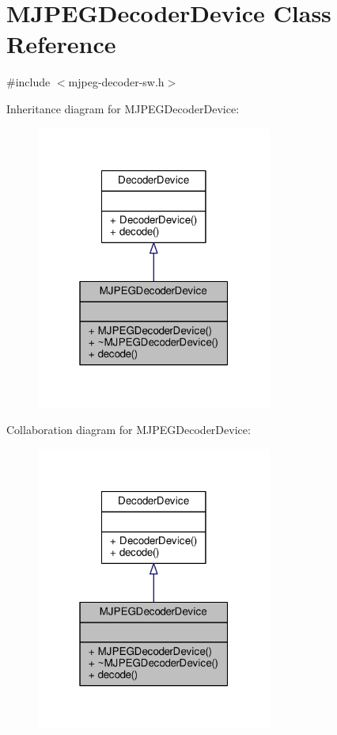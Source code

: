 \hypertarget{classMJPEGDecoderDevice}{}\section{M\+J\+P\+E\+G\+Decoder\+Device Class Reference}
\label{classMJPEGDecoderDevice}


{\ttfamily \#include $<$mjpeg-\/decoder-\/sw.\+h$>$}



Inheritance diagram for M\+J\+P\+E\+G\+Decoder\+Device\+:
\nopagebreak
\begin{figure}[H]
\begin{center}
\leavevmode
\includegraphics[width=220pt]{classMJPEGDecoderDevice__inherit__graph}
\end{center}
\end{figure}


Collaboration diagram for M\+J\+P\+E\+G\+Decoder\+Device\+:
\nopagebreak
\begin{figure}[H]
\begin{center}
\leavevmode
\includegraphics[width=220pt]{classMJPEGDecoderDevice__coll__graph}
\end{center}
\end{figure}
